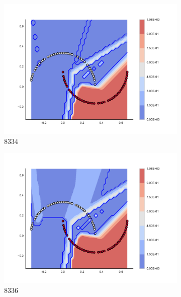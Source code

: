 \begin{figure}[h]
\begin{subfigure}[b]{0.09\textwidth}
    \includegraphics[clip, trim=2.35cm 1.75cm 4.5cm 0cm,width=\textwidth]{img/convergence/8334.pdf}
    \caption{8334}
    \label{fig:convergence_8334}
\end{subfigure}
%
\begin{subfigure}[b]{0.09\textwidth}
    \includegraphics[clip, trim=2.35cm 1.75cm 4.5cm 0cm,width=\textwidth]{img/convergence/8336.pdf}
    \caption{8336}
    \label{fig:convergence_8336}
\end{subfigure}
%
\begin{subfigure}[b]{0.09\textwidth}

\end{subfigure}
\end{figure}
